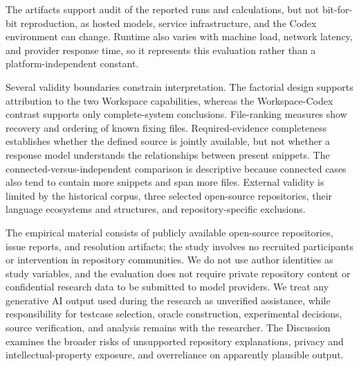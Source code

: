 The artifacts support audit of the reported runs and calculations, but not bit-for-bit reproduction, as hosted models, service infrastructure, and the Codex environment can change. Runtime also varies with machine load, network latency, and provider response time, so it represents this evaluation rather than a platform-independent constant.

Several validity boundaries constrain interpretation. The factorial design supports attribution to the two Workspace capabilities, whereas the Workspace-Codex contrast supports only complete-system conclusions. File-ranking measures show recovery and ordering of known fixing files. Required-evidence completeness establishes whether the defined source is jointly available, but not whether a response model understands the relationships between present snippets. The connected-versus-independent comparison is descriptive because connected cases also tend to contain more snippets and span more files. External validity is limited by the historical corpus, three selected open-source repositories, their language ecosystems and structures, and repository-specific exclusions.

The empirical material consists of publicly available open-source repositories, issue reports, and resolution artifacts; the study involves no recruited participants or intervention in repository communities. We do not use author identities as study variables, and the evaluation does not require private repository content or confidential research data to be submitted to model providers. We treat any generative AI output used during the research as unverified assistance, while responsibility for testcase selection, oracle construction, experimental decisions, source verification, and analysis remains with the researcher. The Discussion examines the broader risks of unsupported repository explanations, privacy and intellectual-property exposure, and overreliance on apparently plausible output.
